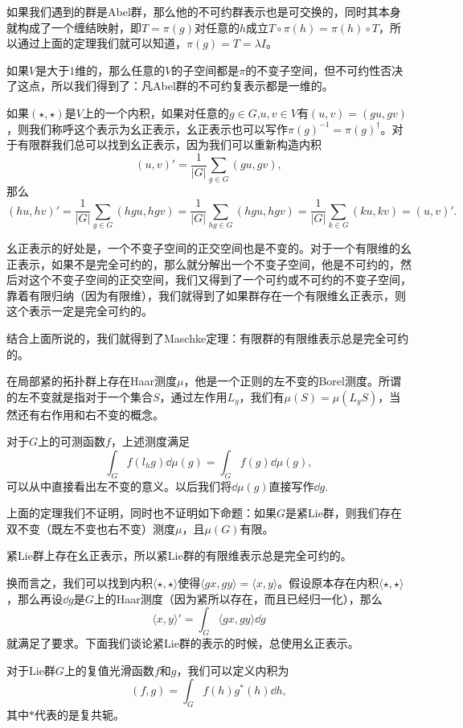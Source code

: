 \para 如果我们遇到的群是Abel群，那么他的不可约群表示也是可交换的，同时其本身就构成了一个缠结映射，即$T=\pi(g)$对任意的$h$成立$T\circ \pi(h)=\pi(h)\circ T$，所以通过上面的定理我们就可以知道，$\pi(g)=T=\lambda I$。

如果$V$是大于$1$维的，那么任意的$V$的子空间都是$\pi$的不变子空间，但不可约性否决了这点，所以我们得到了：凡Abel群的不可约复表示都是一维的。

\para 如果$(\star,\star)$是$V$上的一个内积，如果对任意的$g\in G$,$u,v\in V$有$(u,v)=(gu,gv)$，则我们称呼这个表示为幺正表示，幺正表示也可以写作$\pi(g)^{-1}=\pi(g)^\dag$。对于有限群我们总可以找到幺正表示，因为我们可以重新构造内积
\[
	(u,v)'=\frac{1}{|G|}\sum_{g\in G}(gu,gv),
\]
那么
\[
	(hu,hv)'=\frac{1}{|G|}\sum_{g\in G}(hgu,hgv)=\frac{1}{|G|}\sum_{hg\in G}(hgu,hgv)=\frac{1}{|G|}\sum_{k\in G}(ku,kv)=(u,v)'.
\]

幺正表示的好处是，一个不变子空间的正交空间也是不变的。对于一个有限维的幺正表示，如果不是完全可约的，那么就分解出一个不变子空间，他是不可约的，然后对这个不变子空间的正交空间，我们又得到了一个可约或不可约的不变子空间，靠着有限归纳（因为有限维），我们就得到了如果群存在一个有限维幺正表示，则这个表示一定是完全可约的。

\theo 结合上面所说的，我们就得到了Maschke定理：有限群的有限维表示总是完全可约的。 

\theo 在局部紧的拓扑群上存在Haar测度$\mu$，他是一个正则的左不变的Borel测度。所谓的左不变就是指对于一个集合$S$，通过左作用$L_g$，我们有$\mu(S)=\mu(L_gS)$，当然还有右作用和右不变的概念。

对于$G$上的可测函数$f$，上述测度满足
\[
	\int_G f(l_h g)\dd \mu(g)=\int_G f(g)\dd \mu(g),
\]
可以从中直接看出左不变的意义。以后我们将$\dd \mu(g)$直接写作$\dd g$.

\para 上面的定理我们不证明，同时也不证明如下命题：如果$G$是紧Lie群，则我们存在双不变（既左不变也右不变）测度$\mu$，且$\mu(G)$有限。

\pro 紧Lie群上存在幺正表示，所以紧Lie群的有限维表示总是完全可约的。 

换而言之，我们可以找到内积$\langle \star,\star\rangle$使得$\langle gx,gy\rangle=\langle x,y\rangle$。假设原本存在内积$\langle \star,\star \rangle$，那么再设$\dd g$是$G$上的Haar测度（因为紧所以存在，而且已经归一化），那么
\[
	\langle x,y\rangle'=\int_G \langle gx,gy \rangle \dd g
\]
就满足了要求。下面我们谈论紧Lie群的表示的时候，总使用幺正表示。

\para 对于Lie群$G$上的复值光滑函数$f$和$g$，我们可以定义内积为
\[
	(f,g)=\int_G f(h)g^*(h)\dd h,
\]
其中$*$代表的是复共轭。

